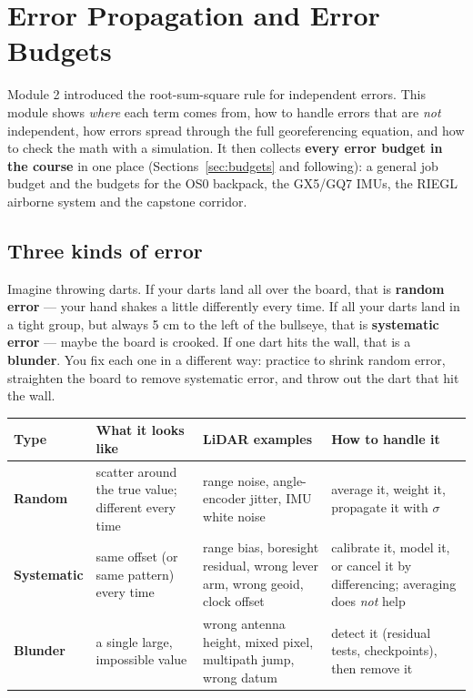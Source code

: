 \chapter{Error Propagation and Error Budgets}

Module 2 introduced the root-sum-square rule for independent errors. This module shows \emph{where} each term comes from, how to handle errors that are \emph{not} independent, how errors spread through the full georeferencing equation, and how to check the math with a simulation. It then collects \textbf{every error budget in the course} in one place (Sections~\ref{sec:budgets} and following): a general job budget and the budgets for the OS0 backpack, the GX5/GQ7 IMUs, the RIEGL airborne system and the capstone corridor.

\section{Three kinds of error}
\begin{kid}
Imagine throwing darts. If your darts land all over the board, that is \textbf{random error} --- your hand shakes a little differently every time. If all your darts land in a tight group, but always 5 cm to the left of the bullseye, that is \textbf{systematic error} --- maybe the board is crooked. If one dart hits the wall, that is a \textbf{blunder}. You fix each one in a different way: practice to shrink random error, straighten the board to remove systematic error, and throw out the dart that hit the wall.
\end{kid}

\begin{center}\small
\renewcommand{\arraystretch}{1.25}
\begin{tabularx}{\linewidth}{>{\bfseries}lXXX}\toprule
Type & What it looks like & LiDAR examples & How to handle it\\\midrule
Random & scatter around the true value; different every time & range noise, angle-encoder jitter, IMU white noise & average it, weight it, propagate it with $\sigma$\\
Systematic & same offset (or same pattern) every time & range bias, boresight residual, wrong lever arm, wrong geoid, clock offset & calibrate it, model it, or cancel it by differencing; averaging does \emph{not} help\\
Blunder & a single large, impossible value & wrong antenna height, mixed pixel, multipath jump, wrong datum & detect it (residual tests, checkpoints), then remove it\\\bottomrule
\end{tabularx}\end{center}

